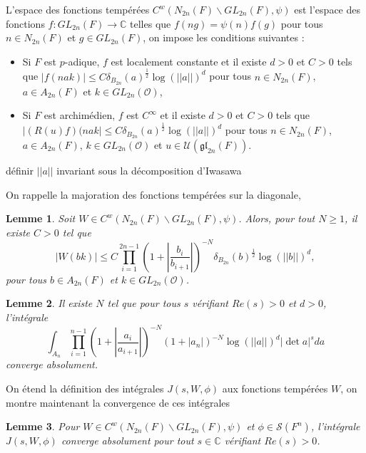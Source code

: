 \documentclass{amsart}
\newtheorem{lemme}{Lemme}[section]
\begin{document}
 L'espace des fonctions tempérées $C^w(N_{2n}(F)\backslash{GL_{2n}(F)}, \psi)$ est l'espace des fonctions $f : GL_{2n}(F) \rightarrow \mathbb{C}$ telles que $f(ng) = \psi(n)f(g)$ pour tous $n \in N_{2n}(F)$ et $g \in GL_{2n}(F)$, on impose les conditions suivantes :
 \begin{itemize}
 \item Si $F$ est $p$-adique, $f$ est localement constante et il existe $d > 0$ et $C > 0$ tels que $|f(nak)| \leq C \delta_{B_{2n}}(a)^{\frac{1}{2}} \log(||a||)^d$ pour tous $n \in N_{2n}(F)$, $a \in A_{2n}(F)$ et $k \in GL_{2n}(\mathcal{O})$,
 \item Si $F$ est archimédien, $f$ est $C^\infty$ et il existe $d > 0$ et $C > 0$ tels que $|(R(u)f)(nak| \leq C \delta_{B_{2n}}(a)^{\frac{1}{2}} \log(||a||)^d$ pour tous $n \in N_{2n}(F)$, $a \in A_{2n}(F)$, $k \in GL_{2n}(\mathcal{O})$ et $u \in \mathcal{U}(\mathfrak{gl}_{2n}(F))$.
 \end{itemize}
 
 définir $||a||$ invariant sous la décomposition d'Iwasawa
 
 
On rappelle la majoration des fonctions tempérées sur la diagonale,
\begin{lemme}
\label{majtemp}
Soit $W \in C^w(N_{2n}(F)\backslash{GL_{2n}(F)}, \psi)$. Alors, pour tout $N \geq 1$, il existe $C > 0$ tel que
\begin{equation}
|W(bk)| \leq C\prod_{i=1}^{2n-1} (1 + |\frac{b_i}{b_{i+1}}|)^{-N}\delta_{B_{2n}}(b)^{\frac{1}{2}}\log(||b||)^d,
\end{equation}
pour tous $b \in A_{2n}(F)$ et $k \in GL_{2n}(\mathcal{O})$.
\end{lemme}

\begin{lemme}
Il existe $N$ tel que pour tous $s$ vérifiant $Re(s) > 0$ et $d > 0$, l'intégrale
\begin{equation}
\int_{A_n} \prod_{i=1}^{n-1} (1+|\frac{a_i}{a_{i+1}}|)^{-N}(1+|a_n|)^{-N}\log(||a||)^d|\det a|^s da
\end{equation}
converge absolument.
\end{lemme}

On étend la définition des intégrales $J(s, W, \phi)$ aux fonctions tempérées $W$, on montre maintenant la convergence de ces intégrales
\begin{lemme}
Pour $W \in C^w(N_{2n}(F)\backslash{GL_{2n}(F)}, \psi)$ et $\phi \in \mathcal{S}(F^n)$, l'intégrale $J(s, W, \phi)$ converge absolument pour tout $s \in \mathbb{C}$ vérifiant $Re(s) > 0$.
\end{lemme}
 
\end{document}
